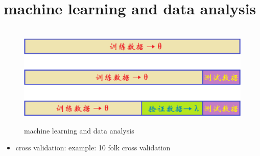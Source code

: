 \documentclass[12pt]{ctexart}%
\begin{document}
	\section{\quad machine learning and data analysis}
	\begin{figure}[H]
		\vspace{-0.5cm}  %
		\setlength{\abovecaptionskip}{-0.2cm}   %
		\centering
		\includegraphics[scale=0.4]{machine_learning_and_data_analysis.png}
		\renewcommand{\figurename}{Fig} %
		\caption{machine learning and data analysis}
		\label{fig:1}
	\end{figure}
	\begin{itemize}
		\item cross validation:
		\subitem example: 10 folk cross validation
	\end{itemize}
\end{document}
